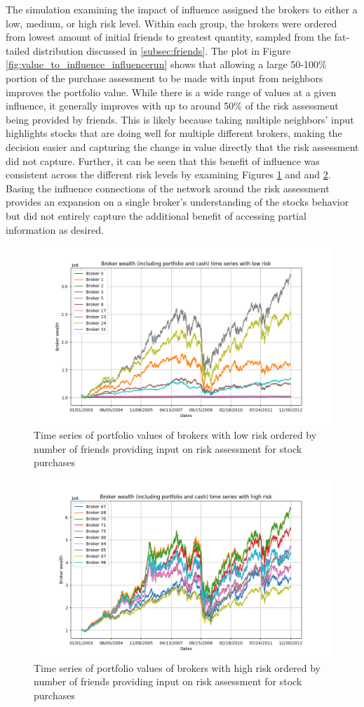 \documentclass[letterpaper, 11 pt, proceedings]{IEEEtran}
\begin{document}
	The simulation examining the impact of influence assigned the brokers to either a low, medium, or high risk level. Within each group, the brokers were ordered from lowest amount of initial friends to greatest quantity, sampled from the fat-tailed distribution discussed in \ref{subsec:friends}. The plot in Figure \ref{fig:value_to_influence_influencerun} shows that allowing a large 50-100\% portion of the purchase assessment to be made with input from neighbors improves the portfolio value. While there is a wide range of values at a given influence, it generally improves with up to around 50\% of the risk assessment being provided by friends. This is likely because taking multiple neighbors' input highlights stocks that are doing well for multiple different brokers, making the decision easier and capturing the change in value directly that the risk assessment did not capture. Further, it can be seen that this benefit of influence was consistent across the different risk levels by examining Figures \ref{fig:low_risk_influence_time_series} and  and \ref{fig:high_risk_influence_time_series}. Basing the influence connections of the network around the risk assessment provides an expansion on a single broker's understanding of the stocks behavior but did not entirely capture the additional benefit of accessing partial information as desired.
	
	\begin{figure}[h]
		\centering
		\includegraphics[width=.5\textwidth]{timeSeriesJoint_influenceRun04_LowRisk.png}
		\caption{Time series of portfolio values of brokers with low risk ordered by number of friends providing input on risk assessment for stock purchases}
		\label{fig:low_risk_influence_time_series}
	\end{figure}	
	\FloatBarrier
	
	\begin{figure}[h]
		\centering
		\includegraphics[width=.5\textwidth]{timeSeriesJoint_influenceRun04_HighRisk.png}
		\caption{Time series of portfolio values of brokers with high risk ordered by number of friends providing input on risk assessment for stock purchases}
		\label{fig:high_risk_influence_time_series}
	\end{figure}	
	\FloatBarrier
	
\end{document}
